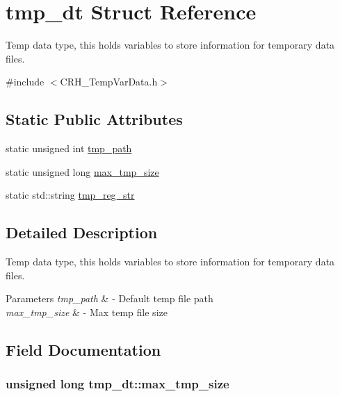 \hypertarget{structtmp__dt}{}\section{tmp\+\_\+dt Struct Reference}
\label{structtmp__dt}


Temp data type, this holds variables to store information for temporary data files.  




{\ttfamily \#include $<$C\+R\+H\+\_\+\+Temp\+Var\+Data.\+h$>$}

\subsection*{Static Public Attributes}
\begin{DoxyCompactItemize}
\item 
static unsigned int \hyperlink{structtmp__dt_a5133f5ea97efb23fde6f33ec7c8d454e}{tmp\+\_\+path}
\item 
static unsigned long \hyperlink{structtmp__dt_a08d502e4fb029c95ab90a50689dab4f0}{max\+\_\+tmp\+\_\+size}
\item 
static std\+::string \hyperlink{structtmp__dt_ae8a89114cd6dda550e3d1561f6fdc7a9}{tmp\+\_\+reg\+\_\+str}
\end{DoxyCompactItemize}


\subsection{Detailed Description}
Temp data type, this holds variables to store information for temporary data files. 


\begin{DoxyParams}{Parameters}
{\em tmp\+\_\+path} & -\/ Default temp file path \\
\hline
{\em max\+\_\+tmp\+\_\+size} & -\/ Max temp file size \\
\hline
\end{DoxyParams}


\subsection{Field Documentation}
\subsubsection[{max\+\_\+tmp\+\_\+size}]{\setlength{\rightskip}{0pt plus 5cm}unsigned long tmp\+\_\+dt\+::max\+\_\+tmp\+\_\+size\hspace{0.3cm}{\ttfamily [static]}}\hypertarget{structtmp__dt_a08d502e4fb029c95ab90a50689dab4f0}{}\label{structtmp__dt_a08d502e4fb029c95ab90a50689dab4f0}
